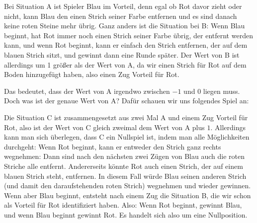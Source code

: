 \documentclass{zusammenfassung}
\begin{document}
\begin{center}
\end{center}

Bei Situation A ist Spieler Blau im Vorteil, denn egal ob Rot davor zieht oder nicht, kann Blau den einen Strich seiner Farbe
entfernen und es sind danach keine roten Steine mehr übrig. Ganz anders ist die Situation bei B: Wenn Blau beginnt, hat Rot immer
noch einen Strich seiner Farbe übrig, der entfernt werden kann, und wenn Rot beginnt, kann er einfach den Strich entfernen, der
auf dem blauen Strich sitzt, und gewinnt dann eine Runde später. Der Wert von B ist allerdings um 1 größer als der Wert von A, da
wir einen Strich für Rot auf dem Boden hinzugefügt haben, also einen Zug Vorteil für Rot.

Das bedeutet, dass der Wert von A irgendwo zwischen $-1$ und $0$ liegen muss. Doch was ist der genaue Wert von A? Dafür schauen
wir uns folgendes Spiel an:

\begin{center}
\end{center}

Die Situation C ist zusammengesetzt aus zwei Mal A und einem Zug Vorteil für Rot, also ist der Wert von C gleich zweimal dem Wert
von A plus $1$. Allerdings kann man sich überlegen, dass C ein Nullspiel ist, indem man alle Möglichkeiten durchgeht: Wenn Rot
beginnt, kann er entweder den Strich ganz rechts wegnehmen: Dann sind nach den nächsten zwei Zügen von Blau auch die roten Striche
alle entfernt. Andererseits könnte Rot auch einen Strich, der auf einem blauen Strich steht, entfernen. In diesem Fall würde Blau
seinen anderen Strich (und damit den daraufstehenden roten Strich) wegnehmen und wieder gewinnen. Wenn aber Blau beginnt, entsteht
nach einem Zug die Situation B, die wir schon als Vorteil für Rot identifiziert haben. Also: Wenn Rot beginnt, gewinnt Blau, und
wenn Blau beginnt gewinnt Rot. Es handelt sich also um eine Nullposition.
\end{document}
